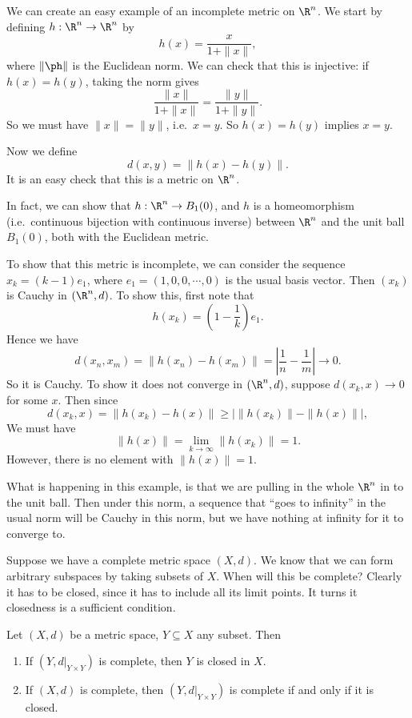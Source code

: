\documentclass[a4paper]{article}
\begin{document}
\begin{eg}
  We can create an easy example of an incomplete metric on $\R^n$. We start by defining $h: \R^n \to \R^n$ by
  \[
    h(x) = \frac{x}{1 + \|x\|},
  \]
  where $\|\ph\|$ is the Euclidean norm. We can check that this is injective: if $h(x) = h(y)$, taking the norm gives
  \[
    \frac{\|x\|}{1 + \|x\|} = \frac{\|y\|}{ 1 + \|y\|}.
  \]
  So we must have $\|x\| = \|y\|$, i.e.\ $x = y$. So $h(x) = h(y)$ implies $x = y$.

  Now we define
  \[
    d(x, y) = \|h(x) - h(y)\|.
  \]
  It is an easy check that this is a metric on $\R^n$.

  In fact, we can show that $h: \R^n \to B_1(0)$, and $h$ is a homeomorphism (i.e.\ continuous bijection with continuous inverse) between $\R^n$ and the unit ball $B_1(0)$, both with the Euclidean metric.

  To show that this metric is incomplete, we can consider the sequence $x_k = (k - 1) e_1$, where $e_1 = (1, 0, 0, \cdots, 0)$ is the usual basis vector. Then $(x_k)$ is Cauchy in $(\R^n, d)$. To show this, first note that
  \[
    h(x_k) = \left(1 - \frac{1}{k}\right) e_1.
  \]
  Hence we have
  \[
    d(x_n, x_m) = \|h(x_n) - h(x_m)\| = \left|\frac{1}{n} - \frac{1}{m}\right| \to 0.
  \]
  So it is Cauchy. To show it does not converge in $(\R^n, d)$, suppose $d(x_k, x) \to 0$ for some $x$. Then since
  \[
    d(x_k, x) = \|h(x_k) - h(x)\| \geq \big| \|h(x_k)\| - \|h(x)\|\big|,
  \]
  We must have
  \[
    \|h(x)\| = \lim_{k \to \infty} \|h(x_k)\| = 1.
  \]
  However, there is no element with $\|h(x)\| = 1$.
\end{eg}
What is happening in this example, is that we are pulling in the whole $\R^n$ in to the unit ball. Then under this norm, a sequence that ``goes to infinity'' in the usual norm will be Cauchy in this norm, but we have nothing at infinity for it to converge to.

Suppose we have a complete metric space $(X, d)$. We know that we can form arbitrary subspaces by taking subsets of $X$. When will this be complete? Clearly it has to be closed, since it has to include all its limit points. It turns it closedness is a sufficient condition.
\begin{thm}
  Let $(X, d)$ be a metric space, $Y \subseteq X$ any subset. Then
  \begin{enumerate}
    \item If $(Y, d|_{Y\times Y})$ is complete, then $Y$ is closed in $X$.
    \item If $(X, d)$ is complete, then $(Y, d|_{Y\times Y})$ is complete if and only if it is closed.
  \end{enumerate}
\end{thm}
\end{document}
